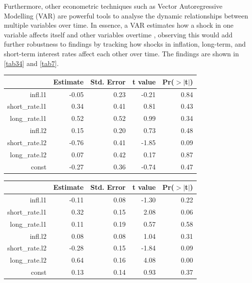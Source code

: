 \documentclass[11pt,preprint]{elsarticle}
\let\origtable\table
\let\endorigtable\endtable
\renewenvironment{table}[1][2] {
    \expandafter\origtable\expandafter[H]
} {
    \endorigtable
}
\numberwithin{equation}{section}
\numberwithin{figure}{section}
\numberwithin{table}{section}
\begin{document}
Furthermore, other econometric techniques such as Vector Autoregressive
Modelling (VAR) are powerful tools to analyse the dynamic relationships
between multiple variables over time. In essence, a VAR estimates how a
shock in one variable affects itself and other variables overtime ,
observing this would add further robustness to findings by tracking how
shocks in inflation, long-term, and short-term interest rates affect
each other over time. The findings are shown in \ref{tab34} and
\ref{tab7}.

\begin{table}[ht]
\centering
\begin{tabular}{rrrrr}
  \hline
 & Estimate & Std. Error & t value & Pr($>$$|$t$|$) \\ 
  \hline
infl.l1 & -0.05 & 0.23 & -0.21 & 0.84 \\ 
  short\_rate.l1 & 0.34 & 0.41 & 0.81 & 0.43 \\ 
  long\_rate.l1 & 0.52 & 0.52 & 0.99 & 0.34 \\ 
  infl.l2 & 0.15 & 0.20 & 0.73 & 0.48 \\ 
  short\_rate.l2 & -0.76 & 0.41 & -1.85 & 0.09 \\ 
  long\_rate.l2 & 0.07 & 0.42 & 0.17 & 0.87 \\ 
  const & -0.27 & 0.36 & -0.74 & 0.47 \\ 
   \hline
\end{tabular}
\caption{VAR Equation for Short-Term Interest Rate \label{tab34}} 
\end{table}

\begin{table}[ht]
\centering
\begin{tabular}{rrrrr}
  \hline
 & Estimate & Std. Error & t value & Pr($>$$|$t$|$) \\ 
  \hline
infl.l1 & -0.11 & 0.08 & -1.30 & 0.22 \\ 
  short\_rate.l1 & 0.32 & 0.15 & 2.08 & 0.06 \\ 
  long\_rate.l1 & 0.11 & 0.19 & 0.57 & 0.58 \\ 
  infl.l2 & 0.08 & 0.08 & 1.04 & 0.31 \\ 
  short\_rate.l2 & -0.28 & 0.15 & -1.84 & 0.09 \\ 
  long\_rate.l2 & 0.64 & 0.16 & 4.08 & 0.00 \\ 
  const & 0.13 & 0.14 & 0.93 & 0.37 \\ 
   \hline
\end{tabular}
\caption{VAR Equation for Long-Term Interest Rate \label{tab7}} 
\end{table}
\end{document}
